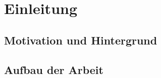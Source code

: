 
\chapter{Einleitung}
\label{Einleitung}

\section{Motivation und Hintergrund}
\label{Motivation_und_Hintergrund}
%




\section{Aufbau der Arbeit}
\label{Aufbau_der_Arbeit}
%

